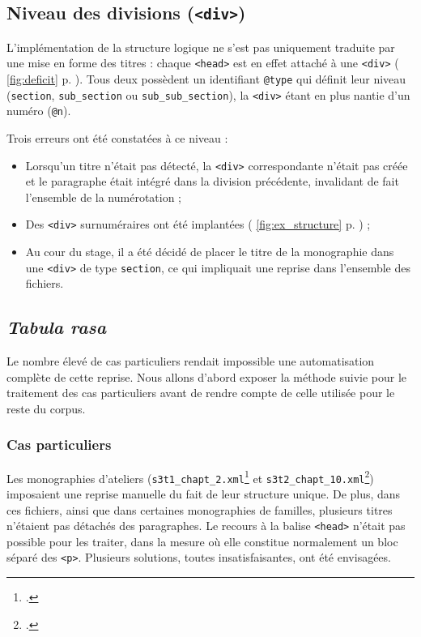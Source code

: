 \subsection{Niveau des divisions (\texttt{<div>})}

L'implémentation de la structure logique ne s'est pas uniquement traduite par une mise en forme des titres : chaque \texttt{<head>} est en effet attaché à une \texttt{<div>} (\fig{} \ref{fig:deficit} p. \pageref{fig:deficit}). Tous deux possèdent un identifiant \texttt{@type} qui définit leur niveau (\texttt{section}, \texttt{sub\_section} ou \texttt{sub\_sub\_section}), la \texttt{<div>} étant en plus nantie d'un numéro (\texttt{@n}).

Trois erreurs ont été constatées à ce niveau :

\begin{itemize}
    \item Lorsqu'un titre n'était pas détecté, la \texttt{<div>} correspondante n'était pas créée et le paragraphe était intégré dans la division précédente, invalidant de fait l'ensemble de la numérotation ;
    \item Des \texttt{<div>} surnuméraires ont été implantées (\fig{} \ref{fig:ex_structure} p. \pageref{fig:ex_structure}) ;
    \item Au cour du stage, il a été décidé de placer le titre de la monographie dans une \texttt{<div>} de type \texttt{section}, ce qui impliquait une reprise dans l'ensemble des fichiers.
\end{itemize}

\subsection{\textit{Tabula rasa}}

Le nombre élevé de cas particuliers rendait impossible une automatisation complète de cette reprise. Nous allons d'abord exposer la méthode suivie pour le traitement des cas particuliers avant de rendre compte de celle utilisée pour le reste du corpus.

\subsubsection{Cas particuliers}

Les monographies d'ateliers (\texttt{s3t1\_chapt\_2.xml}\footcite{mono472a} et \texttt{s3t2\_chapt\_10.xml}\footcite{mono473a}) imposaient une reprise manuelle du fait de leur structure unique. De plus, dans ces fichiers, ainsi que dans certaines monographies de familles, plusieurs titres n'étaient pas détachés des paragraphes. Le recours à la balise \texttt{<head>} n'était pas possible pour les traiter, dans la mesure où elle constitue normalement un bloc séparé des \texttt{<p>}. Plusieurs solutions, toutes insatisfaisantes, ont été envisagées.

